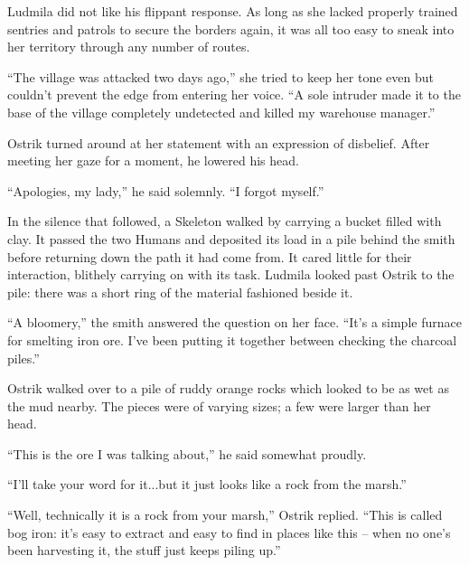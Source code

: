 

Ludmila did not like his flippant response. As long as she lacked properly trained sentries and patrols to secure the borders again, it was all too easy to sneak into her territory through any number of routes.

 

“The village was attacked two days ago,” she tried to keep her tone even but couldn’t prevent the edge from entering her voice. “A sole intruder made it to the base of the village completely undetected and killed my warehouse manager.”

 

Ostrik turned around at her statement with an expression of disbelief. After meeting her gaze for a moment, he lowered his head.

 

“Apologies, my lady,” he said solemnly. “I forgot myself.”

 

In the silence that followed, a Skeleton walked by carrying a bucket filled with clay. It passed the two Humans and deposited its load in a pile behind the smith before returning down the path it had come from. It cared little for their interaction, blithely carrying on with its task. Ludmila looked past Ostrik to the pile: there was a short ring of the material fashioned beside it.

 

“A bloomery,” the smith answered the question on her face. “It’s a simple furnace for smelting iron ore. I’ve been putting it together between checking the charcoal piles.”

 

Ostrik walked over to a pile of ruddy orange rocks which looked to be as wet as the mud nearby. The pieces were of varying sizes; a few were larger than her head.

 

“This is the ore I was talking about,” he said somewhat proudly.

 

“I’ll take your word for it...but it just looks like a rock from the marsh.”

 

“Well, technically it is a rock from your marsh,” Ostrik replied. “This is called bog iron: it’s easy to extract and easy to find in places like this – when no one’s been harvesting it, the stuff just keeps piling up.”

 

